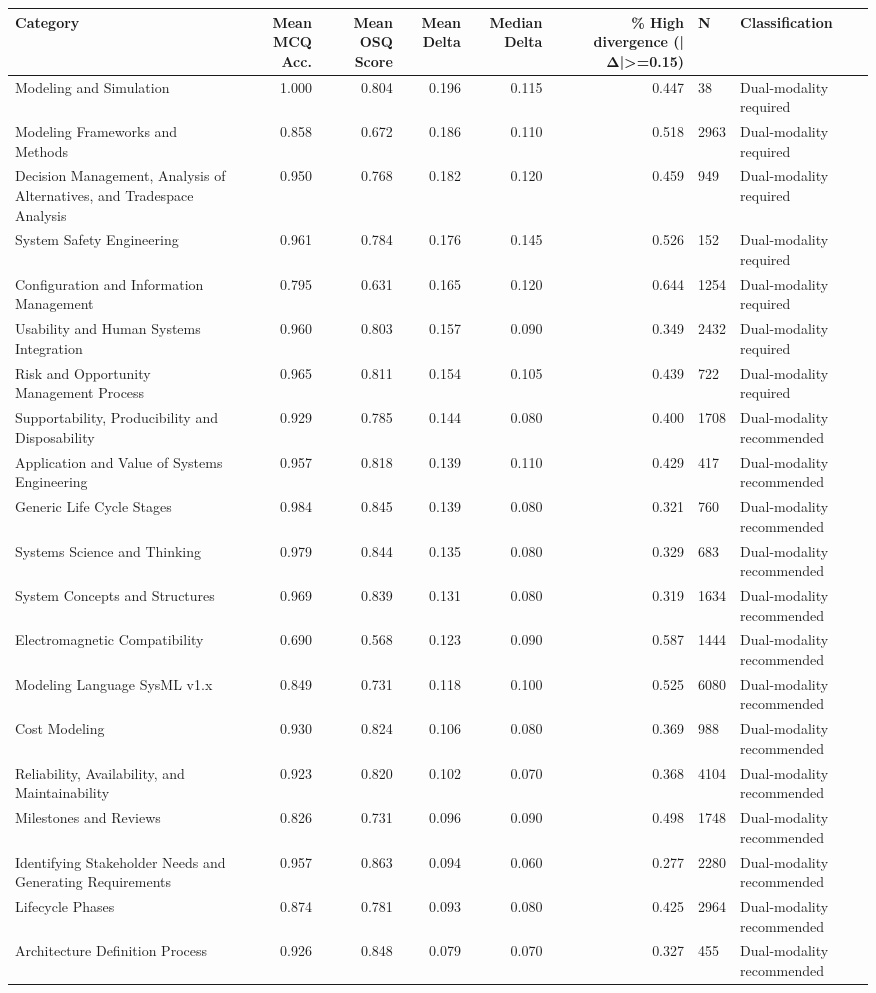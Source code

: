 \begin{tabular}{lrrrrrll}
\toprule
Category & Mean MCQ Acc. & Mean OSQ Score & Mean Delta & Median Delta & \% High divergence (|Δ|>=0.15) & N & Classification \\
\midrule
Modeling and Simulation & 1.000 & 0.804 & 0.196 & 0.115 & 0.447 & 38 & Dual-modality required \\
Modeling Frameworks and Methods & 0.858 & 0.672 & 0.186 & 0.110 & 0.518 & 2963 & Dual-modality required \\
Decision Management, Analysis of Alternatives, and Tradespace Analysis & 0.950 & 0.768 & 0.182 & 0.120 & 0.459 & 949 & Dual-modality required \\
System Safety Engineering & 0.961 & 0.784 & 0.176 & 0.145 & 0.526 & 152 & Dual-modality required \\
Configuration and Information Management & 0.795 & 0.631 & 0.165 & 0.120 & 0.644 & 1254 & Dual-modality required \\
Usability and Human Systems Integration & 0.960 & 0.803 & 0.157 & 0.090 & 0.349 & 2432 & Dual-modality required \\
Risk and Opportunity Management Process & 0.965 & 0.811 & 0.154 & 0.105 & 0.439 & 722 & Dual-modality required \\
Supportability, Producibility and Disposability & 0.929 & 0.785 & 0.144 & 0.080 & 0.400 & 1708 & Dual-modality recommended \\
Application and Value of Systems Engineering & 0.957 & 0.818 & 0.139 & 0.110 & 0.429 & 417 & Dual-modality recommended \\
Generic Life Cycle Stages & 0.984 & 0.845 & 0.139 & 0.080 & 0.321 & 760 & Dual-modality recommended \\
Systems Science and Thinking & 0.979 & 0.844 & 0.135 & 0.080 & 0.329 & 683 & Dual-modality recommended \\
System Concepts and Structures & 0.969 & 0.839 & 0.131 & 0.080 & 0.319 & 1634 & Dual-modality recommended \\
Electromagnetic Compatibility & 0.690 & 0.568 & 0.123 & 0.090 & 0.587 & 1444 & Dual-modality recommended \\
Modeling Language SysML v1.x & 0.849 & 0.731 & 0.118 & 0.100 & 0.525 & 6080 & Dual-modality recommended \\
Cost Modeling & 0.930 & 0.824 & 0.106 & 0.080 & 0.369 & 988 & Dual-modality recommended \\
Reliability, Availability, and Maintainability & 0.923 & 0.820 & 0.102 & 0.070 & 0.368 & 4104 & Dual-modality recommended \\
Milestones and Reviews & 0.826 & 0.731 & 0.096 & 0.090 & 0.498 & 1748 & Dual-modality recommended \\
Identifying Stakeholder Needs and Generating Requirements & 0.957 & 0.863 & 0.094 & 0.060 & 0.277 & 2280 & Dual-modality recommended \\
Lifecycle Phases & 0.874 & 0.781 & 0.093 & 0.080 & 0.425 & 2964 & Dual-modality recommended \\
Architecture Definition Process & 0.926 & 0.848 & 0.079 & 0.070 & 0.327 & 455 & Dual-modality recommended \\
\bottomrule
\end{tabular}
